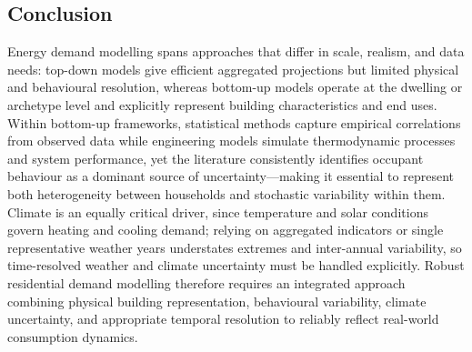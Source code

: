 \subsection{Conclusion}
Energy demand modelling spans approaches that differ in scale, realism, and data needs: top-down models give efficient aggregated projections but limited physical and behavioural resolution, whereas bottom-up models operate at the dwelling or archetype level and explicitly represent building characteristics and end uses. Within bottom-up frameworks, statistical methods capture empirical correlations from observed data while engineering models simulate thermodynamic processes and system performance, yet the literature consistently identifies occupant behaviour as a dominant source of uncertainty—making it essential to represent both heterogeneity between households and stochastic variability within them. Climate is an equally critical driver, since temperature and solar conditions govern heating and cooling demand; relying on aggregated indicators or single representative weather years understates extremes and inter-annual variability, so time-resolved weather and climate uncertainty must be handled explicitly. Robust residential demand modelling therefore requires an integrated approach combining physical building representation, behavioural variability, climate uncertainty, and appropriate temporal resolution to reliably reflect real-world consumption dynamics.

